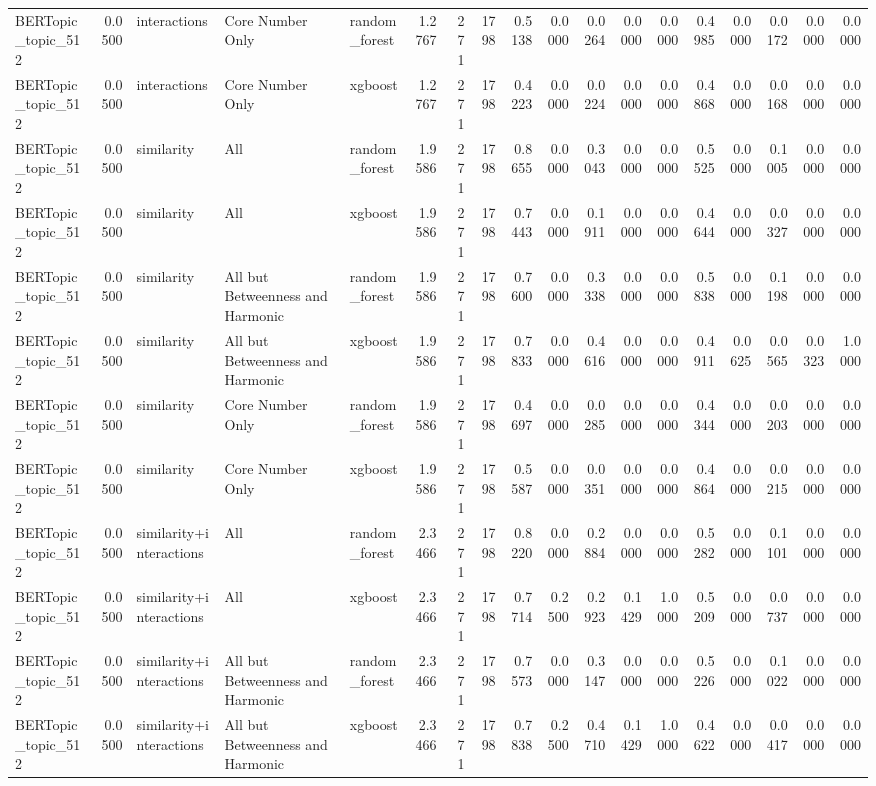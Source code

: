 \begin{tabular}{lrlllrrrrrrrrrrrrr}
BERTopic_topic_512 & 0.0500 & interactions & Core Number Only & random_forest & 1.2767 & 271 & 1798 & 0.5138 & 0.0000 & 0.0264 & 0.0000 & 0.0000 & 0.4985 & 0.0000 & 0.0172 & 0.0000 & 0.0000 \\
BERTopic_topic_512 & 0.0500 & interactions & Core Number Only & xgboost & 1.2767 & 271 & 1798 & 0.4223 & 0.0000 & 0.0224 & 0.0000 & 0.0000 & 0.4868 & 0.0000 & 0.0168 & 0.0000 & 0.0000 \\
BERTopic_topic_512 & 0.0500 & similarity & All & random_forest & 1.9586 & 271 & 1798 & 0.8655 & 0.0000 & 0.3043 & 0.0000 & 0.0000 & 0.5525 & 0.0000 & 0.1005 & 0.0000 & 0.0000 \\
BERTopic_topic_512 & 0.0500 & similarity & All & xgboost & 1.9586 & 271 & 1798 & 0.7443 & 0.0000 & 0.1911 & 0.0000 & 0.0000 & 0.4644 & 0.0000 & 0.0327 & 0.0000 & 0.0000 \\
BERTopic_topic_512 & 0.0500 & similarity & All but Betweenness and Harmonic & random_forest & 1.9586 & 271 & 1798 & 0.7600 & 0.0000 & 0.3338 & 0.0000 & 0.0000 & 0.5838 & 0.0000 & 0.1198 & 0.0000 & 0.0000 \\
BERTopic_topic_512 & 0.0500 & similarity & All but Betweenness and Harmonic & xgboost & 1.9586 & 271 & 1798 & 0.7833 & 0.0000 & 0.4616 & 0.0000 & 0.0000 & 0.4911 & 0.0625 & 0.0565 & 0.0323 & 1.0000 \\
BERTopic_topic_512 & 0.0500 & similarity & Core Number Only & random_forest & 1.9586 & 271 & 1798 & 0.4697 & 0.0000 & 0.0285 & 0.0000 & 0.0000 & 0.4344 & 0.0000 & 0.0203 & 0.0000 & 0.0000 \\
BERTopic_topic_512 & 0.0500 & similarity & Core Number Only & xgboost & 1.9586 & 271 & 1798 & 0.5587 & 0.0000 & 0.0351 & 0.0000 & 0.0000 & 0.4864 & 0.0000 & 0.0215 & 0.0000 & 0.0000 \\
BERTopic_topic_512 & 0.0500 & similarity+interactions & All & random_forest & 2.3466 & 271 & 1798 & 0.8220 & 0.0000 & 0.2884 & 0.0000 & 0.0000 & 0.5282 & 0.0000 & 0.1101 & 0.0000 & 0.0000 \\
BERTopic_topic_512 & 0.0500 & similarity+interactions & All & xgboost & 2.3466 & 271 & 1798 & 0.7714 & 0.2500 & 0.2923 & 0.1429 & 1.0000 & 0.5209 & 0.0000 & 0.0737 & 0.0000 & 0.0000 \\
BERTopic_topic_512 & 0.0500 & similarity+interactions & All but Betweenness and Harmonic & random_forest & 2.3466 & 271 & 1798 & 0.7573 & 0.0000 & 0.3147 & 0.0000 & 0.0000 & 0.5226 & 0.0000 & 0.1022 & 0.0000 & 0.0000 \\
BERTopic_topic_512 & 0.0500 & similarity+interactions & All but Betweenness and Harmonic & xgboost & 2.3466 & 271 & 1798 & 0.7838 & 0.2500 & 0.4710 & 0.1429 & 1.0000 & 0.4622 & 0.0000 & 0.0417 & 0.0000 & 0.0000 \\

\end{tabular}
